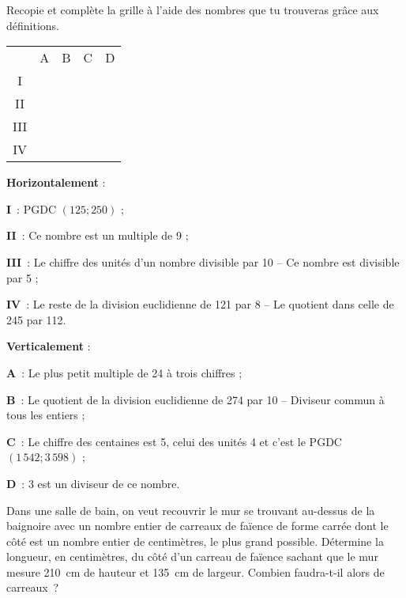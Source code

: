 \begin{exercice}
Recopie et complète la grille à l'aide des nombres que tu trouveras grâce aux définitions.

\begin{center}
\begin{tabularx}{\linewidth}{c|c|c|c|c|}
 & \cellcolor {F2} A & \cellcolor {F2} B & \cellcolor {F2} C & \cellcolor {F2} D \\\cline{2-5}
\cellcolor{H1} I & \cellcolor{G3} & \cellcolor{G3} & \cellcolor{G3} & \cellcolor{Noir} \\\cline{2-5}
\cellcolor{H1} II & \cellcolor{G3} & \cellcolor{G3} & \cellcolor{G3} & \cellcolor{G3} \\\cline{2-5}
\cellcolor{H1} III & \cellcolor{G3} & \cellcolor{Noir} & \cellcolor{G3} & \cellcolor{G3} \\\cline{2-5}
\cellcolor{H1} IV & \cellcolor{Noir} & \cellcolor{G3} & \cellcolor{Noir} & \cellcolor{G3} \\\cline{2-5}
\end{tabularx}
\end{center}

\textbf{Horizontalement} :

\textcolor{H1}{\textbf{I}} : PGDC $(125 ; 250)$ ;

\textcolor{H1}{\textbf{II}} : Ce nombre est un multiple de 9 ;

\textcolor{H1}{\textbf{III}} : Le chiffre des unités d'un nombre divisible par 10 -- Ce nombre est divisible par 5 ;

\textcolor{H1}{\textbf{IV}} : Le reste de la division euclidienne de 121 par 8 -- Le quotient dans celle de 245 par 112.

\textbf{Verticalement} :

\textcolor{F2}{\textbf{A}} : Le plus petit multiple de 24 à trois chiffres ;

\textcolor{F2}{\textbf{B}} : Le quotient de la division euclidienne de 274 par 10 -- Diviseur commun à tous les entiers ;

\textcolor{F2}{\textbf{C}} : Le chiffre des centaines est 5, celui des unités 4 et c'est le PGDC $(1\,542 ; 3\,598)$ ;

\textcolor{F2}{\textbf{D}} : 3 est un diviseur de ce nombre.
\end{exercice}

\begin{exercice}[Carrelage]
Dans une salle de bain, on veut recouvrir le mur se trouvant au-dessus de la baignoire avec un nombre entier de carreaux de faïence de forme carrée dont le côté est un nombre entier de centimètres, le plus grand possible. Détermine la longueur, en centimètres, du côté d'un carreau de faïence sachant que le mur mesure 210 cm de hauteur et 135 cm de largeur. Combien faudra-t-il alors de carreaux ?
\end{exercice}

